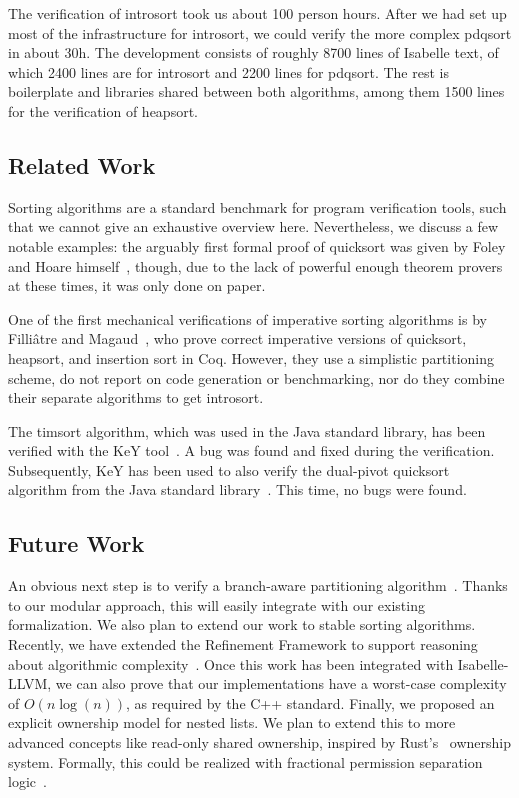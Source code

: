 \documentclass[runningheads]{llncs}
\begin{document}
{The verification of introsort took us about 100 person hours.
After we had set up most of the infrastructure for introsort, we could verify the more
complex pdqsort in about 30h. The development consists of roughly 8700 lines of Isabelle text,
of which 2400 lines are for introsort and 2200 lines for pdqsort. The rest is boilerplate and libraries
shared between both algorithms, among them 1500 lines for the verification of heapsort.


\subsection{Related Work}
Sorting algorithms are a standard benchmark for program verification tools, such that we cannot give an exhaustive overview here.
Nevertheless, we discuss a few notable examples: the arguably first formal proof of quicksort was given
by Foley and Hoare himself~\cite{FoHoa71}, though, due to the lack of powerful enough theorem provers at these times,
it was only done on paper.

One of the first mechanical verifications of imperative sorting algorithms is by
Filli{\^a}tre and Magaud~\cite{FiMa99}, who prove correct imperative versions of quicksort, heapsort, and insertion sort in Coq.
However, they use a simplistic partitioning scheme, do not report on code generation or benchmarking,
nor do they combine their separate algorithms to get introsort.

The timsort algorithm, which was used in the Java standard library, has been verified
with the KeY tool~\cite{GRBBH15}. A bug was found and fixed during the verification.
Subsequently, KeY has been used to also verify the dual-pivot quicksort algorithm from the
Java standard library~\cite{BSSU17}. This time, no bugs were found.

\subsection{Future Work}
An obvious next step is to verify a branch-aware partitioning algorithm~\cite{EdWe16}.
Thanks to our modular approach, this will easily integrate with our existing formalization.
We also plan to extend our work to stable sorting algorithms.
Recently, we have extended the Refinement Framework to support reasoning about algorithmic complexity~\cite{HaLa19}.
Once this work has been integrated with Isabelle-LLVM, we can also prove that our implementations
have a worst-case complexity of $O(n\log(n))$, as required by the C++ standard.
Finally, we proposed an explicit ownership model for nested lists. We plan to extend this
to more advanced concepts like read-only shared ownership, inspired by Rust's~\cite{rustlang} ownership system.
Formally, this could be realized with fractional permission separation logic~\cite{BCOP05}.


}
\end{document}
